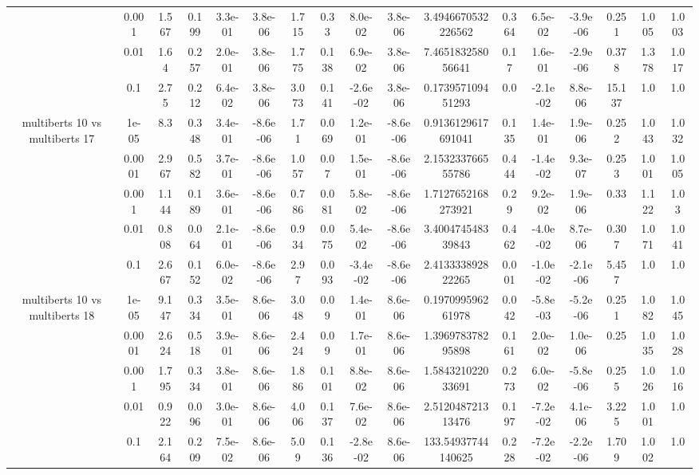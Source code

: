 \begin{tabular}{|c|c|c|c|c|c|c|c|c|c|c|c|c|c|c|c|c|}
 & 0.001 & 1.567 & 0.199 & 3.3e-01 & 3.8e-06 & 1.715 & 0.33 & 8.0e-02 & 3.8e-06 & 3.4946670532226562 & 0.364 & 6.5e-02 & -3.9e-06 & 0.251 & 1.005 & 1.003 \\
 & 0.01 & 1.64 & 0.257 & 2.0e-01 & 3.8e-06 & 1.775 & 0.138 & 6.9e-02 & 3.8e-06 & 7.465183258056641 & 0.17 & 1.6e-01 & -2.9e-06 & 0.378 & 1.378 & 1.017 \\
 & 0.1 & 2.75 & 0.212 & 6.4e-02 & 3.8e-06 & 3.073 & 0.141 & -2.6e-02 & 3.8e-06 & 0.173957109451293 & 0.0 & -2.1e-02 & 8.8e-06 & 15.137 & 1.0 & 1.0 \\
\hline
\multirow{5}{*}{multiberts 10 vs multiberts 17} & 1e-05 & 8.3 & 0.348 & 3.4e-01 & -8.6e-06 & 1.71 & 0.069 & 1.2e-01 & -8.6e-06 & 0.9136129617691041 & 0.135 & 1.4e-01 & 1.9e-06 & 0.252 & 1.043 & 1.032 \\
 & 0.0001 & 2.967 & 0.582 & 3.7e-01 & -8.6e-06 & 1.057 & 0.07 & 1.5e-01 & -8.6e-06 & 2.153233766555786 & 0.444 & -1.4e-02 & 9.3e-07 & 0.253 & 1.001 & 1.005 \\
 & 0.001 & 1.144 & 0.189 & 3.6e-01 & -8.6e-06 & 0.786 & 0.081 & 5.8e-02 & -8.6e-06 & 1.7127652168273921 & 0.29 & 9.2e-02 & 1.9e-06 & 0.33 & 1.122 & 1.03 \\
 & 0.01 & 0.808 & 0.064 & 2.1e-01 & -8.6e-06 & 0.934 & 0.075 & 5.4e-02 & -8.6e-06 & 3.400474548339843 & 0.462 & -4.0e-02 & 8.7e-06 & 0.307 & 1.071 & 1.041 \\
 & 0.1 & 2.667 & 0.152 & 6.0e-02 & -8.6e-06 & 2.97 & 0.093 & -3.4e-02 & -8.6e-06 & 2.413333892822265 & 0.001 & -1.0e-02 & -2.1e-06 & 5.457 & 1.0 & 1.0 \\
\hline
\multirow{5}{*}{multiberts 10 vs multiberts 18} & 1e-05 & 9.147 & 0.334 & 3.5e-01 & 8.6e-06 & 3.048 & 0.09 & 1.4e-01 & 8.6e-06 & 0.197099596261978 & 0.042 & -5.8e-03 & -5.2e-06 & 0.251 & 1.082 & 1.045 \\
 & 0.0001 & 2.624 & 0.518 & 3.9e-01 & 8.6e-06 & 2.424 & 0.09 & 1.7e-01 & 8.6e-06 & 1.396978378295898 & 0.161 & 2.0e-02 & 1.0e-06 & 0.25 & 1.035 & 1.028 \\
 & 0.001 & 1.795 & 0.334 & 3.8e-01 & 8.6e-06 & 1.886 & 0.101 & 8.8e-02 & 8.6e-06 & 1.584321022033691 & 0.273 & 6.0e-02 & -5.8e-06 & 0.255 & 1.026 & 1.016 \\
 & 0.01 & 0.922 & 0.096 & 3.0e-01 & 8.6e-06 & 4.006 & 0.137 & 7.6e-02 & 8.6e-06 & 2.512048721313476 & 0.197 & -7.2e-02 & 4.1e-06 & 3.225 & 1.001 & 1.0 \\
 & 0.1 & 2.164 & 0.209 & 7.5e-02 & 8.6e-06 & 5.09 & 0.136 & -2.8e-02 & 8.6e-06 & 133.54937744140625 & 0.228 & -7.2e-02 & -2.2e-06 & 1.709 & 1.002 & 1.0 \\

\end{tabular}
